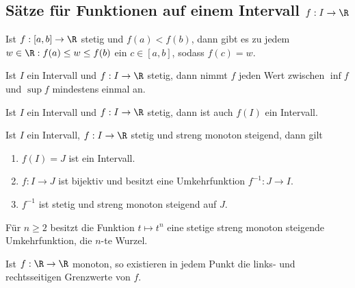 \subsection{Sätze für Funktionen auf einem Intervall $f: I\to\R$}

\begin{prop}
Ist  $f: [a,b]\to \R$ stetig und $f(a)<f(b)$, dann gibt es zu jedem $w\in
\R: f(a) \le w \le f(b)$ ein $c\in[a,b]$, sodass $f(c) = w$.
\end{prop}
\begin{prop}
Ist $I$ ein Intervall und $f: I\to\R$ stetig, dann nimmt $f$ jeden
Wert zwischen $\inf f$ und $\sup f$ mindestens einmal an.
\end{prop}
\begin{prop}
Ist $I$ ein Intervall und $f: I\to\R$ stetig, dann ist auch $f(I)$ ein
Intervall.
\end{prop}
\begin{prop}
Ist $I$ ein Intervall, $f: I\to\R$ stetig und streng monoton steigend, dann
gilt
\begin{enumerate}
  \item $f(I) = J$ ist ein Intervall.
  \item $f: I\to J$ ist bijektiv und besitzt eine Umkehrfunktion $f^{-1}: J \to
  I$.
  \item $f^{-1}$ ist stetig und streng monoton steigend auf $J$.
\end{enumerate}
\end{prop}
\begin{prop}
Für $n\ge 2$ besitzt die Funktion $t\mapsto t^n$ eine stetige streng monoton
steigende Umkehrfunktion, die $n$-te Wurzel.
\end{prop}
\begin{prop}
Ist $f: \R\to\R$ monoton, so existieren in jedem Punkt die links- und
rechtsseitigen Grenzwerte von $f$.
\end{prop}
